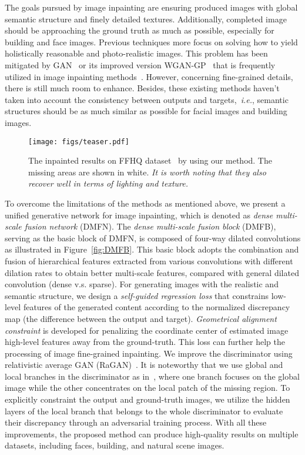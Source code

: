 \documentclass[journal]{IEEEtran}
\newcommand{\ie}{\emph{i.e.}}
\begin{document}
The goals pursued by image inpainting are ensuring produced images with global semantic structure and finely detailed textures. Additionally, completed image should be approaching the ground truth as much as possible, especially for building and face images. Previous techniques more focus on solving how to yield holistically reasonable and photo-realistic images. This problem has been mitigated by GAN~\cite{GAN} or its improved version WGAN-GP~\cite{WGAN-GP} that is frequently utilized in image inpainting methods~\cite{CE,globally-and-locally,high-resolution-multi-scale,GFC,contextual-attention,contextual-based,Shift-Net,GMCNN,PICNet,PEN-Net}. However, concerning fine-grained details, there is still much room to enhance. Besides, these existing methods haven't taken into account the consistency between outputs and targets,~\ie, semantic structures should be as much similar as possible for facial images and building images.

\begin{figure*}[htpb]
	\centering
	\texttt{[image: figs/teaser.pdf]}
	\caption{The inpainted results on FFHQ dataset~\cite{ffhq} by using our method. The missing areas are shown in white. \textit{It is worth noting that they also recover well in terms of lighting and texture.}}
	\label{fig:teaser}
\end{figure*}

To overcome the limitations of the methods as mentioned above, we present a unified generative network for image inpainting, which is denoted as \textit{dense multi-scale fusion network} (DMFN). The \textit{dense multi-scale fusion block} (DMFB), serving as the basic block of DMFN, is composed of four-way dilated convolutions as illustrated in Figure~\ref{fig:DMFB}. This basic block adopts the combination and fusion of hierarchical features extracted from various convolutions with different dilation rates to obtain better multi-scale features, compared with general dilated convolution (dense v.s. sparse). For generating images with the realistic and semantic structure, we design a \textit{self-guided regression loss} that constrains low-level features of the generated content according to the normalized discrepancy map (the difference between the output and target). \textit {Geometrical alignment constraint} is developed for penalizing the coordinate center of estimated image high-level features away from the ground-truth. This loss can further help the processing of image fine-grained inpainting. We improve the discriminator using relativistic average GAN (RaGAN)~\cite{RaGAN}. It is noteworthy that we use global and local branches in the discriminator as in~\cite{globally-and-locally}, where one branch focuses on the global image while the other concentrates on the local patch of the missing region. To explicitly constraint the output and ground-truth images, we utilize the hidden layers of the local branch that belongs to the whole discriminator to evaluate their discrepancy through an adversarial training process. With all these improvements, the proposed method can produce high-quality results on multiple datasets, including faces, building, and natural scene images.
\end{document}
